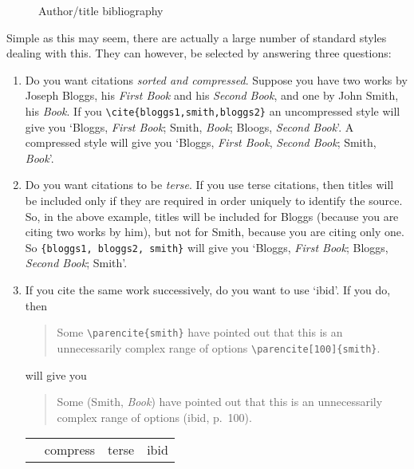 \begin{figure}
\caption{Author/title bibliography\label{example:bibliography:authortitle}}
\end{figure}

Simple as this may seem, there are actually a large number of standard
styles dealing with this. They can however, be selected by answering
three questions:

\begin{enumerate}
\item Do you want citations \emph{sorted and compressed}. Suppose you
  have two works by Joseph Bloggs, his \emph{First Book} and his
  \emph{Second Book}, and one by John Smith, his \emph{Book}. If you
  \verb|\cite{bloggs1,smith,bloggs2}| an uncompressed style will give
  you `Bloggs, \emph{First Book}; Smith, \emph{Book}; Bloogs,
  \emph{Second Book}'. A compressed style will give you `Bloggs,
  \emph{First Book}, \emph{Second Book}; Smith, \emph{Book}'.
\item {}Do you want
  citations to be \emph{terse}. If you use terse citations, then
  titles will be included only if they are required in order uniquely
  to identify the source. So, in the above example, titles will be
  included for Bloggs (because you are citing two works by him), but
  not for Smith, because you are citing only one. So
  \texttt{\{bloggs1, bloggs2, smith\}} will give you `Bloggs,
  \emph{First Book}; Bloggs, \emph{Second Book}; Smith'.
\item {}If you
  cite the same work successively, do you want to use `ibid'. If you
  do, then
\begin{quote}
\ttfamily
Some \verb|\parencite{smith}| have pointed out that this is an unnecessarily
complex range of options \verb|\parencite[100]{smith}|.
\end{quote}
will give you
\begin{quote}
Some (Smith, \emph{Book}) have pointed out that this is an
unnecessarily complex range of options (ibid, p.~100).
\end{quote}
\begin{margintable}
\begin{tabular}{lccc}
\toprule
                            & \textsf{compress} & \textsf{terse} & \textsf{ibid} \\

\end{tabular}
\end{margintable}
\end{enumerate}
